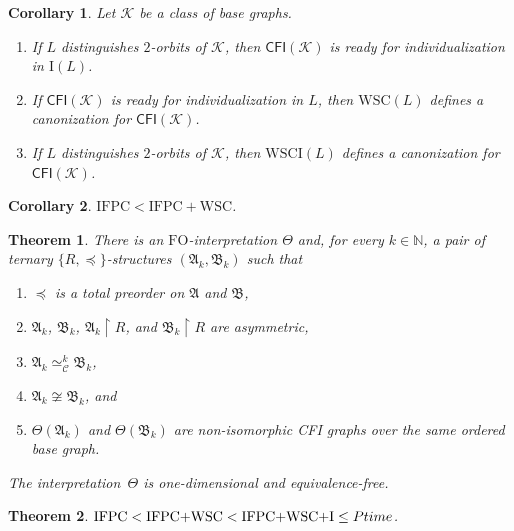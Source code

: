 \documentclass[10pt,a4paper]{amsart}
\newtheorem{thm}{Theorem}
\newtheorem{cor}{Corollary}
\newcommand{\CFI}[1]{\CFIsym(#1)}
\newcommand{\CFIsym}{\mathsf{CFI}}
\newcommand{\FO}{\ensuremath{\mathrm{FO}}}
\newcommand{\GraphClass}{\mathcal{K}}
\newcommand{\IFPC}{\ensuremath{\mathrm{IFPC}}}
\newcommand{\IFPCWSC}{\ensuremath{\mathrm{IFPC{+}WSC}}}
\newcommand{\IFPCWSCI}{\ensuremath{\mathrm{IFPC{+}WSC{+}I}}}
\newcommand{\Iof}[1]{\mathrm{I}(#1)}
\newcommand{\PTime}{\textsc{Ptime}}
\newcommand{\StructA}{\mathfrak{A}}
\newcommand{\StructB}{\mathfrak{B}}
\newcommand{\WSCIof}[1]{\mathrm{WSCI}(#1)}
\newcommand{\WSCof}[1]{\mathrm{WSC}(#1)}
\newcommand{\interpret}{\Theta}
\newcommand{\iso}{\cong}
\newcommand{\kequiv}[1]{\simeq^#1_{\mathcal{C}}}
\newcommand{\nat}{\mathbb{N}}
\newcommand{\reduct}[2]{#1 \upharpoonright #2}
\newcommand{\set}[1]{\lbrace #1 \rbrace}
\newcommand{\spleq}{\preceq}
\begin{document}
\begin{cor}
	\label{cor:canonize-CFI if-base-wsci}
	Let $\GraphClass$ be a class of base graphs.
	\begin{enumerate}
		\item If $L$ distinguishes $2$-orbits of $\GraphClass$,
		then $\CFI{\GraphClass}$ is ready for individualization in 
		$\Iof{L}$.
		\item If $\CFI{\GraphClass}$ is ready for individualization in $L$, then $\WSCof{L}$ defines a canonization for $\CFI{\GraphClass}$.
		\item If $L$ distinguishes $2$-orbits of $\GraphClass$,
		then $\WSCIof{L}$ defines a canonization for $\CFI{\GraphClass}$.
	\end{enumerate}
\end{cor}

\begin{cor}
	\label{cor:ifpc-le-wsc}
	$\IFPC{} < \IFPCWSC$.
\end{cor}

\begin{thm}
	\label{thm:asymmetric-structures-with-CFI graphs}
	There is an \FO{}-interpretation $\interpret$
	and, for every $k \in \nat$, a pair of ternary $\set{R,\spleq}$-structures $(\StructA_k, \StructB_k)$
	such that
	\begin{enumerate}[label=(\alph*)]
		\item $\spleq$ is a total preorder on $\StructA$ and $\StructB$,
		\item $\StructA_k$, $\StructB_k$, $\reduct{\StructA_k}{R}$, and $\reduct{\StructB_k}{R}$ are asymmetric,
		\item $\StructA_k \kequiv{k} \StructB_k$,
		\item $\StructA_k \not\iso \StructB_k$, and
		\item $\interpret(\StructA_k)$ and $\interpret(\StructB_k)$
		are non-isomorphic CFI graphs over the same ordered base graph.
	\end{enumerate}
	The interpretation~$\interpret$ is one-dimensional and equivalence-free.
\end{thm}

\begin{thm}
	\label{thm:wsc-le-wsci}
	$\IFPC{} < \IFPCWSC{} < \IFPCWSCI{} \leq \PTime$.
\end{thm}
\end{document}

